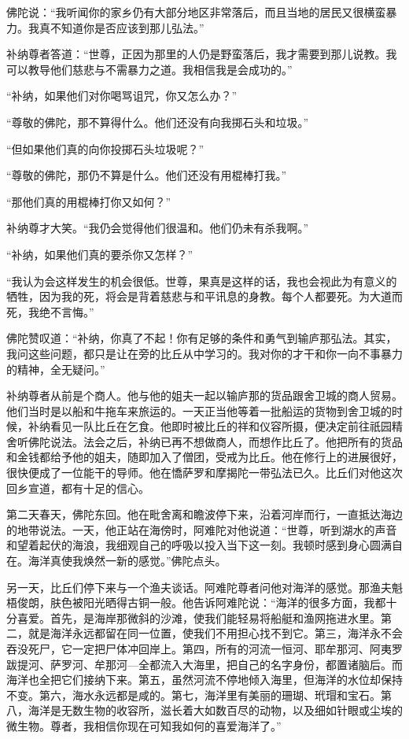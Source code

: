 \documentclass[12pt,twoside,openany]{book}
\begin{document}
佛陀说：“我听闻你的家乡仍有大部分地区非常落后，而且当地的居民又很横蛮暴力。我真不知道你是否应该到那儿弘法。”

补纳尊者答道：“世尊，正因为那里的人仍是野蛮落后，我才需要到那儿说教。我可以教导他们慈悲与不需暴力之道。我相信我是会成功的。”

“补纳，如果他们对你喝骂诅咒，你又怎么办？”

“尊敬的佛陀，那不算得什么。他们还没有向我掷石头和垃圾。”

“但如果他们真的向你投掷石头垃圾呢？”

“尊敬的佛陀，那仍不算是什么。他们还没有用棍棒打我。”

“那他们真的用棍棒打你又如何？”

补纳尊才大笑。“我仍会觉得他们很温和。他们仍未有杀我啊。”

“补纳，如果他们真的要杀你又怎样？”

“我认为会这样发生的机会很低。世尊，果真是这样的话，我也会视此为有意义的牺牲，因为我的死，将会是背着慈悲与和平讯息的身教。每个人都要死。为大道而死，我绝不言悔。”

佛陀赞叹道：“补纳，你真了不起！你有足够的条件和勇气到输庐那弘法。其实，我问这些问题，都只是让在旁的比丘从中学习的。我对你的才干和你一向不事暴力的精神，全无疑问。”

补纳尊者从前是个商人。他与他的姐夫一起以输庐那的货品跟舍卫城的商人贸易。他们当时是以船和牛拖车来旅运的。一天正当他等着一批船运的货物到舍卫城的时候，补纳看见一队比丘在乞食。他即时被比丘的祥和仪容所摄，便决定前往祇园精舍听佛陀说法。法会之后，补纳已再不想做商人，而想作比丘了。他把所有的货品和金钱都给予他的姐夫，随即加入了僧团，受戒为比丘。他在修行上的进展很好，很快便成了一位能干的导师。他在憍萨罗和摩揭陀一带弘法已久。比丘们对他这次回乡宣道，都有十足的信心。

第二天春天，佛陀东回。他在毗舍离和瞻波停下来，沿着河岸而行，一直抵达海边的地带说法。一天，他正站在海傍时，阿难陀对他说道：“世尊，听到湖水的声音和望着起伏的海浪，我细观自己的呼吸以投入当下这一刻。我顿时感到身心圆满自在。海洋真使我焕然一新的感觉。”佛陀点头。

另一天，比丘们停下来与一个渔夫谈话。阿难陀尊者问他对海洋的感觉。那渔夫魁梧俊朗，肤色被阳光晒得古铜一般。他告诉阿难陀说：“海洋的很多方面，我都十分喜爱。首先，是海岸那微斜的沙滩，使我们能轻易将船艇和渔网拖进水里。第二，就是海洋永远都留在同一位置，使我们不用担心找不到它。第三，海洋永不会吞没死尸，它一定把尸体冲回岸上。第四，所有的河流一恒河、耶牟那河、阿夷罗跋提河、萨罗河、牟那河—全都流入大海里，把自己的名字身份，都置诸脑后。而海洋也全把它们接纳下来。第五，虽然河流不停地倾入海里，但海洋的水位却保持不变。第六，海水永远都是咸的。第七，海洋里有美丽的珊瑚、玳瑁和宝石。第八，海洋是无数生物的收容所，滋长着大如数百尽的动物，以及细如针眼或尘埃的微生物。尊者，我相信你现在可知我如何的喜爱海洋了。”
\end{document}
